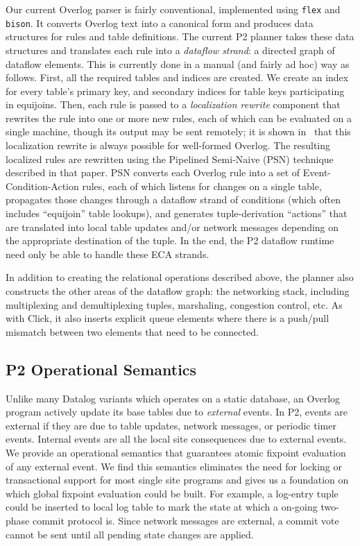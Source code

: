 \documentclass{vldb}
\begin{document}
Our current Overlog parser is fairly conventional, implemented using
\texttt{flex} and \texttt{bison}.  It converts Overlog text into a
canonical form and produces data structures for rules and table
definitions.  The current P2 planner takes these data
structures and translates each rule into a {\em dataflow strand}: a
directed graph of dataflow elements.  This is currently done in a
manual (and fairly ad hoc) way as follows.  First, all the required
tables and indices are created.  We create an index for every table's
primary key, and secondary indices for table keys participating in
equijoins.  Then, each rule is passed to a {\em localization rewrite}
component that rewrites the rule into one or more new rules, each of
which can be evaluated on a single machine, though its output may be
sent remotely; it is shown in~\cite{loo-sigmod06} that this
localization rewrite is always possible for well-formed Overlog.  The
resulting localized rules are rewritten using the Pipelined Semi-Naive
(PSN) technique described in that paper.  PSN converts each
Overlog rule into a set of Event-Condition-Action rules, each of which
listens for changes on a single table, propagates those changes
through a dataflow strand of conditions (which often includes
``equijoin'' table lookups), and generates tuple-derivation
``actions'' that are translated into local table updates and/or
network messages depending on the appropriate destination of the
tuple.  In the end, the P2 dataflow runtime need only be able to
handle these ECA strands.

In addition to creating the relational operations described above, the
planner also constructs the other areas of the dataflow graph: the
networking stack, including multiplexing and demultiplexing tuples,
marshaling, congestion control, etc.  As with Click, it also inserts
explicit queue elements where there is a push/pull mismatch between
two elements that need to be connected.

\subsection{P2 Operational Semantics}
Unlike many Datalog variants which operates on a static database,
an Overlog program actively update its base tables 
due to \emph{external} events.
In P2, events are external if they are due to table updates, network messages,
or periodic timer events.
Internal events are all the local site consequences due to external events.
We provide an operational semantics that guarantees atomic fixpoint 
evaluation of any external event.
We find this semantics eliminates the need for locking or 
transactional support for most single site programs and 
gives us a foundation on which global fixpoint evaluation 
could be built.
For example, a log-entry tuple could be inserted to local log table
to mark the state at which a on-going two-phase commit protocol is.
Since network messages are external, a commit vote cannot
be sent until all pending state changes are applied.
\end{document}
